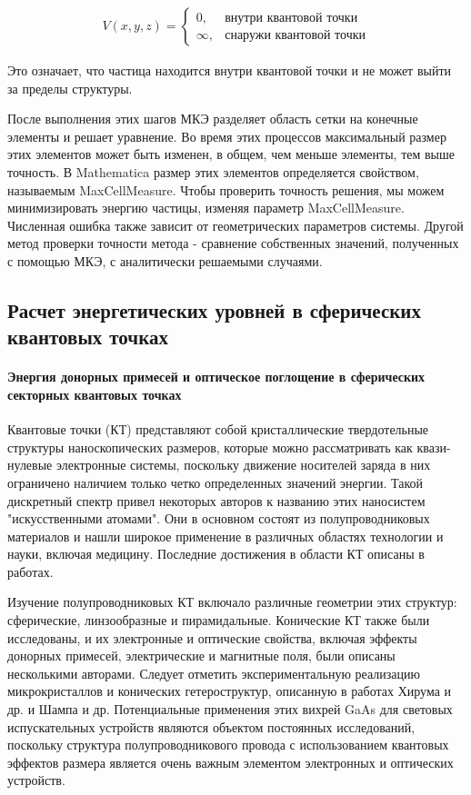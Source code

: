 \documentclass[a4paper,14pt]{extarticle}
\begin{document}
\begin{eqnarray}
    V(x,y,z) = \begin{cases}
    0, & \text{внутри квантовой точки} \\
    \infty, & \text{снаружи квантовой точки}
    \end{cases}
    \end{eqnarray}
    
Это означает, что частица находится внутри квантовой точки и не может выйти за пределы структуры.

После выполнения этих шагов МКЭ разделяет область сетки на конечные элементы и решает уравнение. Во время этих процессов максимальный размер этих элементов может быть изменен, в общем, чем меньше элементы, тем выше точность. В Mathematica размер этих элементов определяется свойством, называемым MaxCellMeasure. Чтобы проверить точность решения, мы можем минимизировать энергию частицы, изменяя параметр MaxCellMeasure. Численная ошибка также зависит от геометрических параметров системы. Другой метод проверки точности метода - сравнение собственных значений, полученных с помощью МКЭ, с аналитически решаемыми случаями.\cite{mantashyan}

\subsection{Расчет энергетических уровней в сферических квантовых точках}

\paragraph{Энергия донорных примесей и оптическое поглощение в сферических секторных квантовых точках}

Квантовые точки (КТ) представляют собой кристаллические твердотельные структуры наноскопических размеров, которые можно рассматривать как квази-нулевые электронные системы, поскольку движение носителей заряда в них ограничено наличием только четко определенных значений энергии. Такой дискретный спектр привел некоторых авторов к названию этих наносистем "искусственными атомами". Они в основном состоят из полупроводниковых материалов и нашли широкое применение в различных областях технологии и науки, включая медицину. Последние достижения в области КТ описаны в работах.

Изучение полупроводниковых КТ включало различные геометрии этих структур: сферические, линзообразные и пирамидальные. Конические КТ также были исследованы, и их электронные и оптические свойства, включая эффекты донорных примесей, электрические и магнитные поля, были описаны несколькими авторами. Следует отметить экспериментальную реализацию микрокристаллов и конических гетероструктур, описанную в работах Хирума и др. и Шампа и др. Потенциальные применения этих вихрей GaAs для световых испускательных устройств являются объектом постоянных исследований, поскольку структура полупроводникового провода с использованием квантовых эффектов размера является очень важным элементом электронных и оптических устройств.
\end{document}

